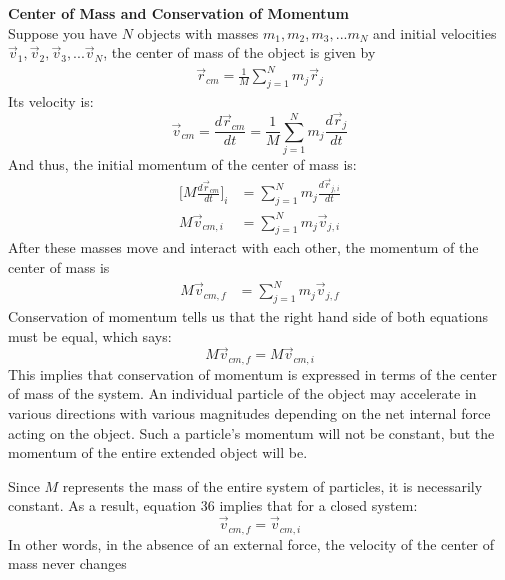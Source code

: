 \documentclass[a4paper]{article}
\let\bf\textbf
\begin{document}
\noindent\bf{Center of Mass and Conservation of Momentum}
\vspace{2mm}\\
Suppose you have $N$ objects with masses $m_1, m_2, m_3, ... m_N$ and initial velocities $\vec{v}_1, \vec{v}_2, \vec{v}_3, ... \vec{v}_N$, the center of mass of the object is given by
\begin{align*}
    \vec{r}_{cm} = \frac{1}{M}\sum_{j = 1}^{N}m_j\vec{r}_j
\end{align*}
Its velocity is:
\begin{equation}
    \vec{v}_{cm} = \frac{d\vec{r}_{cm}}{dt} = \frac{1}{M}\sum_{j = 1}^{N}m_j\frac{d\vec{r}_j}{dt}
\end{equation}
And thus, the initial momentum of the center of mass is:
\begin{align*}
    \bigg[M\frac{d\vec{r}_{cm}}{dt}\bigg]_i &= \sum_{j = 1}^{N}m_j\frac{d\vec{r}_{j,i}}{dt}\\
    M\vec{v}_{cm,i} &= \sum_{j = 1}^{N}m_j\vec{v}_{j,i}
\end{align*}
After these masses move and interact with each other, the momentum of the center of mass is
\begin{align*}
    M\vec{v}_{cm,f} &= \sum_{j = 1}^{N}m_j\vec{v}_{j,f}
\end{align*}
Conservation of momentum tells us that the right hand side of both equations must be equal, which says:
\begin{equation}
    M\vec{v}_{cm,f} = M\vec{v}_{cm,i}
\end{equation}
This implies that conservation of momentum is expressed in terms of the center of mass of the system. An individual particle of the object may accelerate in various directions with various magnitudes depending on the net internal force acting on the object. Such a particle's momentum will not be constant, but the momentum of the entire extended object will be.\par
Since $M$ represents the mass of the entire system of particles, it is necessarily constant. As a result, equation 36 implies that for a closed system:
\begin{equation}
    \vec{v}_{cm,f} = \vec{v}_{cm,i}
\end{equation}
In other words, in the absence of an external force, the velocity of the center of mass never changes
\end{document}
